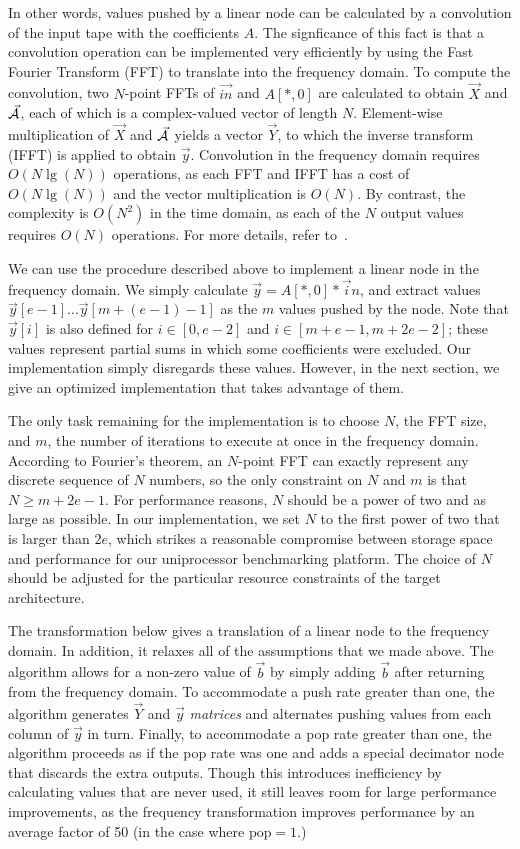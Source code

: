 In other words, values pushed by a linear node can be calculated by a
convolution of the input tape with the coefficients $A$.  The
signficance of this fact is that a convolution operation can be
implemented very efficiently by using the Fast Fourier Transform (FFT)
to translate into the frequency domain.  To compute the convolution,
two $N$-point FFTs of $\vec{in}$ and $A[*,0]$ are calculated to obtain
$\vec{X}$ and $\vec{\cal A}$, each of which is a complex-valued vector
of length $N$.  Element-wise multiplication of $\vec X$ and
$\vec{\cal A}$ yields a vector $\vec{Y}$, to which the inverse
transform (IFFT) is applied to obtain $\vec{y}$.  Convolution in the
frequency domain requires $O(N \lg(N))$ operations, as each FFT and
IFFT has a cost of $O(N \lg (N))$ and the vector multiplication is
$O(N)$.  By contrast, the complexity is $O(N^2)$ in the time domain,
as each of the $N$ output values requires $O(N)$ operations.  For more
details, refer to~\cite{oppenheim-discrete}.

We can use the procedure described above to implement a linear node in
the frequency domain.  We simply calculate ${\vec y} = A[*,0] * {\vec
in}$, and extract values ${\vec y}[e-1] \dots {\vec y}[m+(e-1)-1]$ as
the $m$ values pushed by the node.  Note that ${\vec y}[i]$ is also
defined for $i \in [0, e-2]$ and $i \in [m+e-1,m+2e-2]$; these values
represent partial sums in which some coefficients were excluded.  Our
{\naive} implementation simply disregards these values.  However, in the
next section, we give an optimized implementation that takes advantage
of them.

The only task remaining for the implementation is to choose $N$, the
FFT size, and $m$, the number of iterations to execute at once in the
frequency domain.  According to Fourier's theorem, an $N$-point FFT
can exactly represent any discrete sequence of $N$ numbers, so the
only constraint on $N$ and $m$ is that $N \ge m+2e-1$.  For
performance reasons, $N$ should be a power of two and as large as
possible.  In our implementation, we set $N$ to the first power of two
that is larger than $2e$, which strikes a reasonable compromise
between storage space and performance for our uniprocessor
benchmarking platform.  The choice of $N$ should be adjusted for the
particular resource constraints of the target architecture.

The transformation below gives a {\naive} translation of a linear node to
the frequency domain.  In addition, it relaxes all of the assumptions
that we made above.  The algorithm allows for a non-zero value of
${\vec b}$ by simply adding $\vec{b}$ after returning from the
frequency domain.  To accommodate a push rate greater than one, the
algorithm generates $\vec{Y}$ and $\vec{y}$ {\it matrices} and
alternates pushing values from each column of $\vec{y}$ in turn.
Finally, to accommodate a pop rate greater than one, the algorithm
proceeds as if the pop rate was one and adds a special decimator node
that discards the extra outputs.  Though this introduces inefficiency
by calculating values that are never used, it still leaves room for
large performance improvements, as the frequency transformation
improves performance by an average factor of 50 (in the case where
$\mbox{pop}=1$.)


